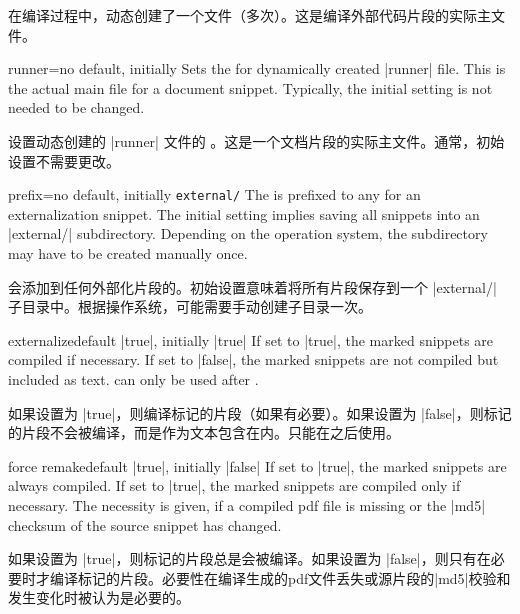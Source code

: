 在编译过程中，动态创建了一个文件（多次）。这是编译外部代码片段的实际主文件。
\begin{extTcbKey}[][doc new=2015-03-11]{runner}{=}{no default,
  initially \texttt{}}
Sets the  for dynamically created |runner| file.
This is the actual main file for a document snippet.
Typically, the initial setting is not needed to be changed.

设置动态创建的 |runner| 文件的 。这是一个文档片段的实际主文件。通常，初始设置不需要更改。
\begin{dispListing}
\end{dispListing}
\end{extTcbKey}

\begin{extTcbKey}[][doc new=2015-03-11]{prefix}{=}{no default,
  initially \texttt{external/}}
The  is prefixed to any  for an
externalization snippet. The initial setting implies saving all snippets
into an |external/| subdirectory. Depending on the operation system,
the subdirectory may have to be created manually once.

 会添加到任何外部化片段的。初始设置意味着将所有片段保存到一个 |external/| 子目录中。根据操作系统，可能需要手动创建子目录一次。
\begin{dispListing}
\end{dispListing}
\end{extTcbKey}


\begin{extTcbKey}[][doc new=2015-03-11]{externalize}{}{default |true|,
  initially |true|}
If set to |true|, the marked snippets are compiled if necessary.
If set to |false|, the marked snippets are not compiled but included as text.
 can only be used after .

如果设置为 |true|，则编译标记的片段（如果有必要）。如果设置为 |false|，则标记的片段不会被编译，而是作为文本包含在内。只能在之后使用。
\end{extTcbKey}

\begin{extTcbKey}[][doc new=2015-03-11]{force remake}{}{default |true|,
  initially |false|}
If set to |true|, the marked snippets are always compiled.
If set to |true|, the marked snippets are compiled only if necessary.
The necessity is given, if a compiled pdf file is missing or the
|md5| checksum of the source snippet has changed.

如果设置为 |true|，则标记的片段总是会被编译。如果设置为 |false|，则只有在必要时才编译标记的片段。必要性在编译生成的pdf文件丢失或源片段的|md5|校验和发生变化时被认为是必要的。
\end{extTcbKey}

